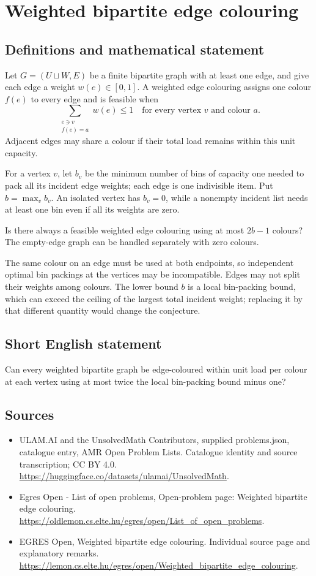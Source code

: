 \documentclass[11pt,a4paper]{article}
\begin{document}
\section*{Weighted bipartite edge colouring}\label{statement}

\subsection{Definitions and mathematical statement}
Let $G=(U\sqcup W,E)$ be a finite bipartite graph with at least
one edge, and give each edge a weight $w(e)\in[0,1]$.
A weighted edge colouring assigns one colour $f(e)$ to every edge
and is feasible when
\[
                       \sum_{\substack{e\ni v\\f(e)=a}}w(e)\le1
                                 \quad\text{for every vertex }v
                                 \text{ and colour }a.
\]
Adjacent edges may share a colour if their total load remains
within this unit capacity.

For a vertex $v$, let $b_v$ be the minimum number of bins of
capacity one needed to pack all its incident edge weights;
each edge is one indivisible item. Put $b=\max_v b_v$.
An isolated vertex has $b_v=0$, while a nonempty incident list
needs at least one bin even if all its weights are zero.

Is there always a feasible weighted edge colouring using at most
$2b-1$ colours? The empty-edge graph can be handled separately
with zero colours.

The same colour on an edge must be used at both endpoints,
so independent optimal bin packings at the vertices may be
incompatible. Edges may not split their weights among colours.
The lower bound $b$ is a local bin-packing bound, which can
exceed the ceiling of the largest total incident weight; replacing
it by that different quantity would change the conjecture.
\subsection{Short English statement}
Can every weighted bipartite graph be edge-coloured within unit
load per colour at each vertex using at most twice the local bin-packing bound minus one?
\subsection{Sources}
\begin{itemize}
\item[S1] ULAM.AI and the UnsolvedMath Contributors, supplied problems.json, catalogue entry, AMR Open Problem Lists. Catalogue identity and source transcription; CC BY 4.0.
\url{https://huggingface.co/datasets/ulamai/UnsolvedMath}.
\item[S2] Egres Open - List of open problems, Open-problem page: Weighted bipartite edge colouring. 
\url{https://oldlemon.cs.elte.hu/egres/open/List_of_open_problems}.
\item[S3] EGRES Open, Weighted bipartite edge colouring. Individual source page and explanatory remarks.
\url{https://lemon.cs.elte.hu/egres/open/Weighted_bipartite_edge_colouring}.
\end{itemize}
\end{document}
